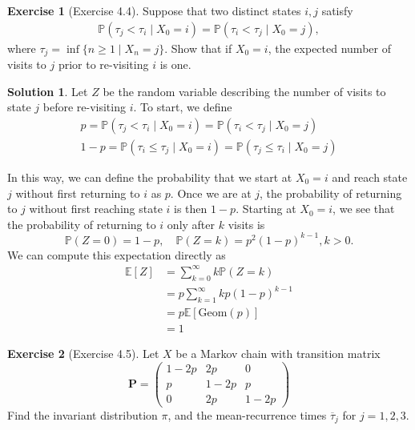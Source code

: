 \documentclass[12pt]{article}
\newcommand{\Prob}{\mathbb{P}}
\newcommand{\Expect}{\mathbb{E}}
\let\vec\mathbf
\theoremstyle{definition}
\newtheorem{exer}{Exercise}
\newtheorem{sol}{Solution}
\theoremstyle{remark}
\begin{document}
\newpage 

\begin{exer}[Exercise 4.4]
      Suppose that two distinct states $i,j$ satisfy
    \begin{align*}
    \Prob(\tau_{j} < \tau_{i} \mid X_{0} = i) = \Prob(\tau_{i} < \tau_{j} \mid X_{0 } = j),
    \end{align*}
    where $\tau_{j} = \inf\{ n\geq 1  \mid  X_{n} = j\}$. Show that if $X_{0}= i$, the expected number of visits to $j$ prior to re-visiting $i$ is one.
\end{exer}

\begin{sol}
Let $Z$ be the random variable describing the number of visits to state $j$ before re-visiting $i$. To start, we define 
    \begin{align*}
    p = \Prob(\tau_{j} < \tau_{i} \mid X_{0} = i) = \Prob(\tau_{i} < \tau_{j} \mid X_{0 } = j) \\
    1 - p = \Prob(\tau_{i} \leq \tau_{j}  \mid X_{0} = i) = \Prob(\tau_{j} \leq \tau_{i} \mid X_{0}=j)
    \end{align*}

In this way, we can define the probability that we start at $X_{0} = i$ and reach state $j$ without first returning to $i$ as $p$. Once we are at $j$, the probability of returning to $j$ without first reaching state $i$ is then $1-p$. Starting at $X_{0} = i$, we see that the probability of returning to $i$ only after $k$ visits is
\begin{equation*}
    \Prob(Z = 0) = 1-p, \quad \Prob(Z = k) = p^{2}(1-p)^{k-1}, k > 0.
\end{equation*}
We can compute this expectation directly as 
\begin{align*}
    \Expect[Z] &= \sum_{k=0}^{\infty } k \Prob(Z = k)\\
               &= p\sum_{k=1}^{\infty } k p (1-p)^{k-1}\\
               &= p \Expect[ \text{Geom}(p) ]\\
               &= 1
\end{align*}
\end{sol}

\newpage 

\begin{exer}[Exercise 4.5]
    Let $X$ be a Markov chain with transition matrix
    \begin{equation*}
    \vec{P} 
    = 
    \begin{pmatrix}
        1 - 2p & 2p & 0 \\
        p & 1 - 2p & p \\
        0 & 2p & 1-2p
    \end{pmatrix}
    \end{equation*}
    Find the invariant distribution $\pi$, and the mean-recurrence times $\overline{\tau}_{j}$ for $j = 1,2,3$.
\end{exer}
\end{document}
